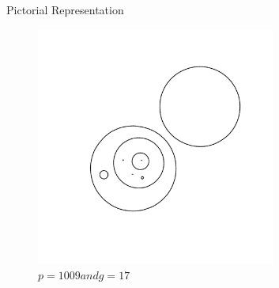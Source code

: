 \begin{frame}{Pictorial Representation}
    \begin{figure}
        \centering
        \includegraphics[width=0.7\textwidth]{figures/graph_0011_1009.pdf}
        \caption{$p = 1009 and g = 17$}
        \label{fig:smiley}
    \end{figure}
\end{frame}

